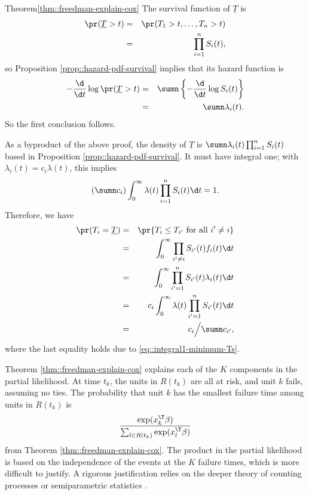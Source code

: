\begin{myproof}{Theorem}{\ref{thm::freedman-explain-cox}}
The survival function of $\underline{T} $ is
\begin{eqnarray*}
\pr (  \underline{T} > t  ) 
&=& \pr(  T_1>t,\ldots, T_n>t ) \\
&=& \prod_{i=1}^n S_i(t) ,
\end{eqnarray*}
so Proposition \ref{prop::hazard-pdf-survival} implies that its hazard function is
\begin{eqnarray*}
- \frac{\d}{\d t} \log \pr ( \underline{T} > t )  
&=& \sumn \left\{ - \frac{\d}{\d t} \log   S_i(t) \right\} \\
&=& \sumn \lambda_i(t). 
\end{eqnarray*}
So the first conclusion follows. 
 
 
As a byproduct of the above proof, the density of $\underline{T} $ is $\sumn \lambda_i(t) \prod_{i=1}^n S_i(t)$ based in Proposition \ref{prop::hazard-pdf-survival}. It must have integral one; with $\lambda_i(t) = c_i \lambda(t)$, this implies 
\begin{equation}
\left( \sumn c_i  \right) \int_0^{\infty} \lambda(t) \prod_{i=1}^n S_i(t) \d t = 1.
\label{eq::integral1-minimum-Ts}
\end{equation}
Therefore, we have 
\begin{eqnarray*}
\pr ( T_i = \underline{T}   ) 
&=& \pr\{ T_i \leq T_{i'} \text{ for all } i' \neq i  \} \\
&=& \int_0^{\infty}   \prod_{i' \neq i} S_{i'}(t)  f_i(t) \d t\\
&=&  \int_0^{\infty}   \prod_{i'=1}^n S_{i'}(t)  \lambda_i(t) \d t \\
&=& c_i  \int_0^{\infty}  \lambda(t)   \prod_{i'=1}^n S_{i'}(t)  \d t \\
&=& c_i  \Big /  \sumn c_{i'},
\end{eqnarray*}
where the last equality holds due to \eqref{eq::integral1-minimum-Ts}. 
\end{myproof}

Theorem \ref{thm::freedman-explain-cox} explains each of the $K$ components in the partial likelihood. At time $t_k$, the units in $R(t_k)$ are all at risk, and unit $k$ fails, assuming no ties. The probability that unit $k$ has the smallest failure time among units in $R(t_k)$ is 
$$
 \frac{   \exp(x_k^{\T} \beta)  }{ \sum_{l\in R(t_k)}    \exp(x_l^{\T} \beta) } 
$$
from Theorem \ref{thm::freedman-explain-cox}. The product in the partial likelihood is based on the independence of the events at the $K$ failure times, which is more difficult to justify. A rigorous justification relies on the deeper theory of counting processes \citep{fleming2011counting} or semiparametric statistics \citep{tsiatis2007semiparametric}. 



